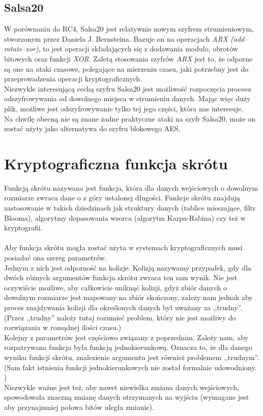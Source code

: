 \subsection{Salsa20}
W porównaniu do RC4, Salsa20 jest relatywnie nowym szyfrem strumieniowym, stworzonym przez Daniela J. Bernsteina. 
Bazuje on na operacjach \textit{ARX (add–rotate–xor)}, to jest operacji składających się z dodawania modulo, obrotów bitowych oraz funkcji \textit{XOR}. 
Zaletą stosowania szyfrów \textit{ARX} jest to, że odporne są one na ataki czasowe, polegające na mierzeniu czasu,
jaki potrzebny jest do przeprowadzenia operacji kryptograficznych. \\
Niezwykle interesującą cechą szyfru Salsa20 jest możliwość rozpoczęcia procesu odszyfrowywania od dowolnego miejsca w strumieniu danych. Mając więc duży plik, możliwe jest odszyfrowywanie tylko tej jego części, która nas interesuje. \\
Na chwilę obecną nie są znane żadne praktyczne ataki na szyfr Salsa20, może on zostać użyty jako alternatywa do szyfru blokowego AES.

\section{Kryptograficzna funkcja skrótu}
Funkcją skrótu nazywana jest funkcja, która dla danych wejściowych o dowolnym rozmiarze zwraca dane o z góry ustalonej długości. Funkcje skrótu znajdują zastosowanie w takich dziedzinach jak struktury danych (tablice mieszające, filtr Blooma), algorytmy dopasowania wzorca (algorytm Karpa-Rabina) czy też w kryptografii. \\ \\
Aby funkcja skrótu mogła zostać użyta w systemach kryptograficznych musi posiadać ona szereg parametrów. \\
Jednym z nich jest odporność na kolizje. Kolizją nazywamy przypadek, gdy dla dwóch różnych argumentów funkcja skrótu zwraca ten sam wynik. Nie jest oczywiście możliwe, aby całkowicie uniknąć kolizji, gdyż zbiór danych o dowolnym rozmiarze jest mapowany na zbiór skończony, zależy nam jednak aby proces znajdywania kolizji dla określonych danych był uważany za ,,trudny''. (Przez ,,trudny'' należy tutaj rozumieć problem, który nie jest możliwy do rozwiązania w rozsądnej ilości czasu.) \\
Kolejny z parametrów jest częściowo związany z poprzednim. Zależy nam, aby rozpatrywana funkcja była funkcją jednokierunkową. Oznacza to, że dla danego wyniku funkcji skrótu, znalezienie argumentu jest również problemem ,,trudnym''.
(Sam fakt istnienia funkcji jednokierunkowych nie został formalnie udowodniony. \cite{oneway}) \\
Niezwykle ważne jest też, aby nawet niewielka zmiana danych wejściowych, spowodowała znaczną zmianę danych otrzymanych na wyjściu (wymagane jest aby przynajmniej połowa bitów uległa zmianie).

